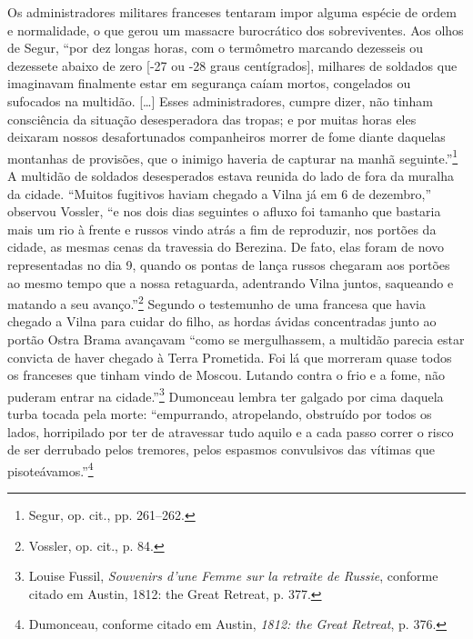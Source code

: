 Os administradores militares franceses tentaram impor alguma espécie de
ordem e normalidade, o que gerou um massacre burocrático dos
sobreviventes. Aos olhos de Segur, ``por dez longas horas, com o
termômetro marcando dezesseis ou dezessete abaixo de zero {[}-27 ou -28
graus centígrados{]}, milhares de soldados que imaginavam finalmente
estar em segurança caíam mortos, congelados ou sufocados na multidão.
[\ldots{}] Esses administradores, cumpre dizer, não tinham consciência da
situação desesperadora das tropas; e por muitas horas eles deixaram
nossos desafortunados companheiros morrer de fome diante daquelas
montanhas de provisões, que o inimigo haveria de capturar na manhã
seguinte.''\footnote{Segur, op. cit., pp. 261--262.} A multidão de
soldados desesperados estava reunida do lado de fora da muralha da
cidade. ``Muitos fugitivos haviam chegado a Vilna já em 6 de dezembro,''
observou Vossler, ``e nos dois dias seguintes o afluxo foi tamanho que
bastaria mais um rio à frente e russos vindo atrás a fim de reproduzir,
nos portões da cidade, as mesmas cenas da travessia do Berezina. De
fato, elas foram de novo representadas no dia 9, quando os pontas de
lança russos chegaram aos portões ao mesmo tempo que a nossa retaguarda,
adentrando Vilna juntos, saqueando e matando a seu avanço.''\footnote{Vossler, op. cit., p. 84.} Segundo o testemunho de uma francesa que havia chegado a Vilna para cuidar do filho, as hordas ávidas concentradas
junto ao portão Ostra Brama avançavam ``como se mergulhassem, a multidão
parecia estar convicta de haver chegado à Terra Prometida. Foi lá que
morreram quase todos os franceses que tinham vindo de Moscou. Lutando
contra o frio e a fome, não puderam entrar na cidade.''\footnote{Louise Fussil, \textit{Souvenirs d'une Femme sur la retraite de Russie}, conforme citado em Austin, 1812: the Great Retreat, p. 377.} Dumonceau lembra ter galgado por cima daquela turba tocada pela morte:
``empurrando, atropelando, obstruído por todos os lados, horripilado por
ter de atravessar tudo aquilo e a cada passo correr o risco de ser
derrubado pelos tremores, pelos espasmos convulsivos das vítimas que
pisoteávamos.''\footnote{Dumonceau, conforme citado em Austin, \textit{1812: the Great Retreat}, p. 376.}

